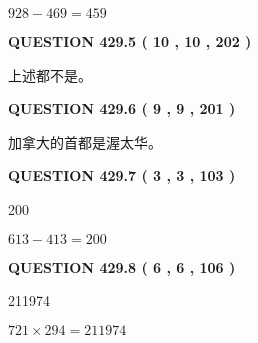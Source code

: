 \documentclass{ctexart}
\begin{document}
$ %
928 -  %
469=   %
459$
 
 
  
\vspace{0.2in}
  
{\textbf{\Large{QUESTION
429.5 
 ( 10 , 10 , 202 )
}}}
  
  
 
 
\noindent{}
 
 
 上述都不是。
 
 
 
 
  
\vspace{0.2in}
  
{\textbf{\Large{QUESTION
429.6 
 ( 9 , 9 , 201 )
}}}
  
  
 
 
\noindent{}
 
 
加拿大的首都是渥太华。
 
 
 
 
  
\vspace{0.2in}
  
{\textbf{\Large{QUESTION
429.7 
 ( 3 , 3 , 103 )
}}}
  
  
 
 
\noindent{}

200
 
 
 
 
\noindent{}

$ %
613 -  %
413=   %
200$
 
 
  
\vspace{0.2in}
  
{\textbf{\Large{QUESTION
429.8 
 ( 6 , 6 , 106 )
}}}
  
  
 
 
\noindent{}

211974
 
 
 
 
\noindent{}

$ %
721 \times  %
294=   %
211974$
 
\end{document}
